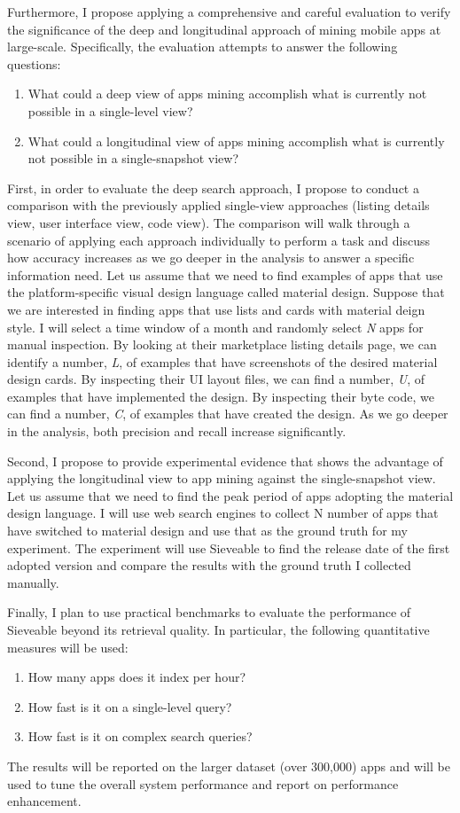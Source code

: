 Furthermore, I propose applying a comprehensive and careful evaluation to verify the significance of the deep and longitudinal approach of mining mobile apps at large-scale.
Specifically, the evaluation attempts to answer the following questions:
\begin{enumerate}
	\item What could a deep view of apps mining accomplish what is currently not possible in a single-level view?
	\item What could a longitudinal view of apps mining accomplish what is currently not possible in a single-snapshot view?
\end{enumerate}

First, in order to evaluate the deep search approach, I propose to conduct a comparison with the previously applied single-view approaches (listing details view, user interface view, code view).
The comparison will walk through a scenario of applying each approach individually to perform a task and discuss how accuracy increases as we go deeper in the analysis to answer a specific information need.
Let us assume that we need to find examples of apps that use the platform-specific visual design language called material design.
Suppose that we are interested in finding apps that use lists and cards with material deign style.
I will select a time window of a month and randomly select \textit{N} apps for manual inspection.
By looking at their marketplace listing details page, we can identify a number, \textit{L}, of examples that have screenshots of the desired material design cards.
By inspecting their UI layout files, we can find a number, \textit{U}, of examples that have implemented the design.
By inspecting their byte code, we can find a number, \textit{C}, of examples that have created the design.
As we go deeper in the analysis, both precision and recall increase significantly.

Second, I propose to provide experimental evidence that shows the advantage of applying the longitudinal view to app mining against the single-snapshot view.
Let us assume that we need to find the peak period of apps adopting the material design language.
I will use web search engines to collect N number of apps that have switched to material design and use that as the ground truth for my experiment.
The experiment will use Sieveable to find the release date of the first adopted version and compare the results with the ground truth I collected manually.

Finally, I plan to use practical benchmarks to evaluate the performance of Sieveable beyond its retrieval quality. In particular, the following quantitative measures will be used:
\begin{enumerate}
	\item How many apps does it index per hour?
	\item How fast is it on a single-level query?
	\item How fast is it on complex search queries?
\end{enumerate}
The results will be reported on the larger dataset (over 300,000) apps and will be used to tune the overall system performance and report on performance enhancement.

